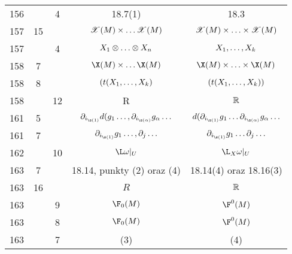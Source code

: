 \documentclass[a4paper,11pt]{article}
\begin{document}
\begin{center}
\begin{tabular}{|c|c|c|c|c|}
    156 & &  4 & 18.7(1) & 18.3 \\
    157 & 15 & & $\mathcal{X}( M ) \times \ldots \mathcal{X}( M )$
           & $\mathcal{X}( M ) \times \ldots \times \mathcal{X}( M )$ \\
    157 & &  4 & $X_{ 1 } \otimes \ldots \otimes X_{ n }$ & $X_{ 1 }, \ldots, X_{ k }$ \\
    158 &  7 & & $\X( M ) \ti \ld \X( M )$
           & $\X( M ) \ti \ld \ti \X( M )$ \\
    158 &  8 & & $( t( X_{ 1 }, \ldots, X_{ k } )$
           & $( t( X_{ 1 }, \ldots, X_{ k } ) )$ \\
    158 & & 12 & R & $\mathbb{R}$ \\
    161 &  5 & & $\pr_{ i_{ \s( 1 ) } } d( g_{ 1 } \ld,
                 \pr_{ i_{ \s( \al ) } } g_{ \al } \ld$
           & $d( \pr_{ i_{ \s( 1 ) } } g_{ 1 } \ld
             \pr_{ i_{ \s( \al ) } } g_{ \al } \ld$ \\
    161 &  7 & & $\pr_{ i_{ \s( 1 ) } } g_{ 1 } \ld, \pr_{ j }\ld$
           & $\pr_{ i_{ \s( 1 ) } } g_{ 1 } \ld \pr_{ j }\ld$ \\
    162 & & 10 & $\L\om |_{ U }$ & $\L_{ X }\om|_{ U } $ \\
    163 &  7 & & 18.14, punkty (2) oraz (4) & 18.14(4) oraz 18.16(3) \\
    163 & 16 & & $R$ & $\mathbb{R}$ \\
    163 & &  9 & $\F_{ 0 }( M )$ & $\F^{ 0 }( M )$ \\
    163 & &  8 & $\F_{ 0 }( M )$ & $\F^{ 0 }( M )$ \\
    163 & &  7 & (3) & (4) \\
    \hline
  \end{tabular}



\end{center}
\end{document}
